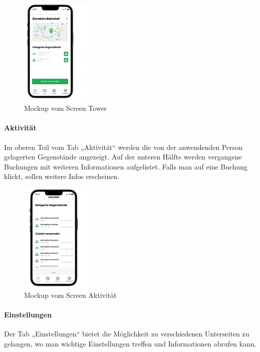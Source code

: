 \begin{figure}[H]
  \centering
  \includegraphics[width=0.3\textwidth]{images/app_mock_tower}
  \caption{\Gls{Mockup} vom Screen Tower}
  \label{fig:screentowermock}
\end{figure}

\bigskip


\paragraph{Aktivität}Im oberen Teil vom \Gls{Tab} „Aktivität“ werden die von der anwendenden Person gelagerten Gegenstände angezeigt. Auf der unteren Hälfte werden vergangene Buchungen mit weiteren Informationen aufgelistet. Falls man auf eine Buchung klickt, sollen weitere Infos erscheinen.

\begin{figure}[H]
  \centering
  \includegraphics[width=0.3\textwidth]{images/app_mock_objects}
  \caption{\Gls{Mockup} vom Screen Aktivität}
  \label{fig:screenactivitymock}
\end{figure}

\bigskip


\paragraph{Einstellungen}Der \Gls{Tab} „Einstellungen“ bietet die Möglichkeit zu verschiedenen Unterseiten zu gelangen, wo man wichtige Einstellungen treffen und Informationen abrufen kann.

